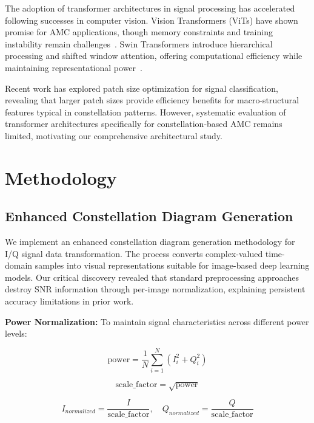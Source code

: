 \documentclass{ELSP}
\begin{document}
The adoption of transformer architectures in signal processing has accelerated following successes in computer vision. Vision Transformers (ViTs) have shown promise for AMC applications, though memory constraints and training instability remain challenges~\cite{vit2020}. Swin Transformers introduce hierarchical processing and shifted window attention, offering computational efficiency while maintaining representational power~\cite{swin2021}.

Recent work has explored patch size optimization for signal classification, revealing that larger patch sizes provide efficiency benefits for macro-structural features typical in constellation patterns. However, systematic evaluation of transformer architectures specifically for constellation-based AMC remains limited, motivating our comprehensive architectural study.

\section{Methodology}

\subsection{Enhanced Constellation Diagram Generation}

We implement an enhanced constellation diagram generation methodology for I/Q signal data transformation. The process converts complex-valued time-domain samples into visual representations suitable for image-based deep learning models. Our critical discovery revealed that standard preprocessing approaches destroy SNR information through per-image normalization, explaining persistent accuracy limitations in prior work.

\textbf{Power Normalization:} To maintain signal characteristics across different power levels:

\begin{equation}
\text{power} = \frac{1}{N} \sum_{i=1}^{N} (I_i^2 + Q_i^2)
\end{equation}

\begin{equation}
\text{scale\_factor} = \sqrt{\text{power}}
\end{equation}

\begin{equation}
I_{normalized} = \frac{I}{\text{scale\_factor}}, \quad Q_{normalized} = \frac{Q}{\text{scale\_factor}}
\end{equation}
\end{document}
